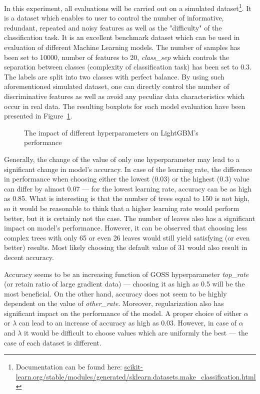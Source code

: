 \documentclass[magisterska, english]{pwr_wmat_praca_dyplomowa}
\theoremstyle{plain}
\numberwithin{theorem}{chapter}
\theoremstyle{definition}
\numberwithin{theorem}{chapter}
\begin{document}
In this experiment, all evaluations will be carried out on a simulated dataset\footnote{Documentation can be found here: \url{scikit-learn.org/stable/modules/generated/sklearn.datasets.make_classification.html}}. It is a dataset which enables to user to control the number of informative, redundant, repeated and noisy features as well as the "difficulty" of the classification task. It is an excellent benchmark dataset which can be used in evaluation of different Machine Learning models. The number of samples has been set to 10000, number of features to 20, \emph{class\_sep} which controls the separation between classes (complexity of classification task) has been set to 0.3. The labels are split into two classes with perfect balance. By using such aforementioned simulated dataset, one can directly control the number of discriminative features as well as avoid any peculiar data characteristics which occur in real data. The resulting boxplots for each model evaluation have been presented in Figure~\ref{fig:lightgbm_tuning}.

\begin{figure}[H]
	\centering
	\caption{The impact of different hyperparameters on LightGBM's performance}
	\label{fig:lightgbm_tuning}
\end{figure}
\newpage
Generally, the change of the value of only one hyperparameter may lead to a significant change in model's accuracy. In case of the learning rate, the difference in performance when choosing either the lowest (0.03) or the highest (0.3) value can differ by almost 0.07 --- for the lowest learning rate, accuracy can be as high as 0.85. What is interesting is that the number of trees equal to 150 is not high, so it would be reasonable to think that a higher learning rate would perform better, but it is certainly not the case. The number of leaves also has a significant impact on model's performance. However, it can be observed that choosing less complex trees with only 65 or even 26 leaves would still yield satisfying (or even better) results. Most likely choosing the default value of 31 would also result in decent accuracy.

Accuracy seems to be an increasing function of GOSS hyperparameter \emph{top\_rate} (or retain ratio of large gradient data) --- choosing it as high as 0.5 will be the most beneficial. On the other hand, accuracy does not seem to be highly dependent on the value of \emph{other\_rate}. Moreover, regularization also has significant impact on the performance of the model. A proper choice of either $\alpha$ or $\lambda$ can lead to an increase of accuracy as high as 0.03. However, in case of $\alpha$ and $\lambda$ it would be difficult to choose values which are uniformly the best --- the case of each dataset is different.
\end{document}

